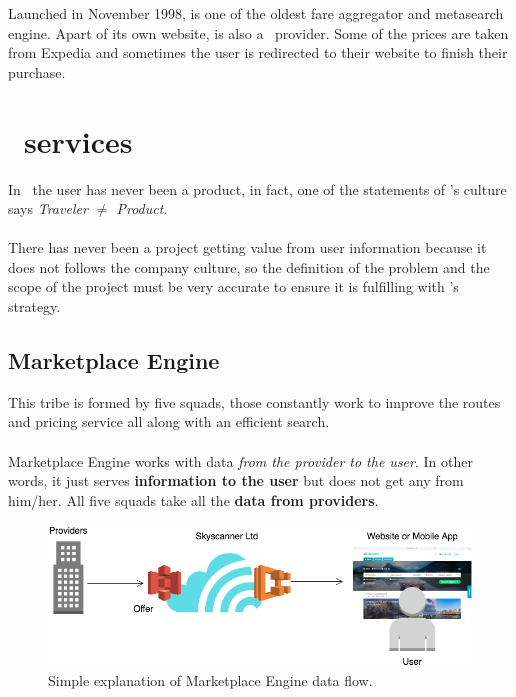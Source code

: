 Launched in November 1998, is one of the oldest fare aggregator and metasearch engine. Apart of its own website, is also a \company\ provider. Some of the prices are taken from Expedia\cite{expedia} and sometimes the user is redirected to their website to finish their purchase.


\section{\company\ services}

In \company\ the user has never been a product, in fact, one of the statements of \company's culture says \textit{Traveler $\neq$ Product}\cite{the_road_ahead}.
\\\\
There has never been a project getting value from user information because it does not follows the company culture, so the definition of the problem and the scope of the project must be very accurate to ensure it is fulfilling with \company's strategy\cite{skyscanner_strategy}.

\subsection{Marketplace Engine} \label{mp_engine}

This tribe is formed by five squads, those constantly work to improve the routes and pricing service all along with an efficient search.
\\\\
Marketplace Engine works with data \textit{from the provider to the user}. In other words, it just serves \textbf{information to the user} but does not get any from him/her. All five squads take all the \textbf{data from providers}.

\begin{figure}[H]
\centering
\includegraphics[scale=0.45]{diagrams/state-of-the-art-tribes-marketplace-engine.png}
\caption{Simple explanation of Marketplace Engine data flow.}
\end{figure}

